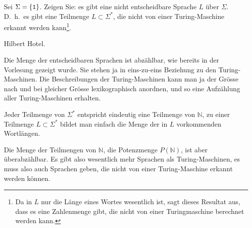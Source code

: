 Sei $\Sigma=\{{\tt 1}\}$. Zeigen Sie: es gibt eine nicht entscheidbare
Sprache $L$ über $\Sigma$.
D.~h.~es gibt eine Teilmenge $L\subset \Sigma^*$, die nicht
von einer Turing-Maschine erkannt werden kann\footnote{Da in $L$
nur die Länge eines Wortes wesentlich ist, sagt dieses Resultat
aus, dass es eine Zahlenmenge gibt, die nicht von einer Turingmaschine
berechnet werden kann.}.

\begin{hinweis}
Hilbert Hotel.
\end{hinweis}

\begin{loesung}
Die Menge der entscheidbaren Sprachen ist abzählbar, wie bereits in
der Vorlesung gezeigt wurde. Sie stehen ja
in eins-zu-eins Beziehung zu den Turing-Maschinen. Die Beschreibungen
der Turing-Maschinen kann man ja der Grösse nach und bei gleicher Grösse
lexikographisch anordnen, und so eine Auf\-zählung aller Turing-Maschinen
erhalten.

Jeder Teilmenge von $\Sigma^*$ entspricht eindeutig eine Teilmenge
von $\mathbb N$, zu einer Teilmenge $L\subset\Sigma^*$
bildet man einfach die Menge der in $L$ vorkommenden Wortlängen.

Die Menge der Teilmengen von $\mathbb N$, die Potenzmenge $P(\mathbb N)$,
ist aber überabzählbar.
Es gibt also wesentlich mehr Sprachen als Turing-Maschinen, es
muss also auch Sprachen geben, die nicht von einer Turing-Maschine
erkannt werden können.
\end{loesung}
